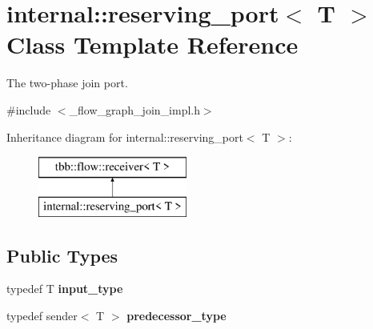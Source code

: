 \hypertarget{classinternal_1_1reserving__port}{}\section{internal\+:\+:reserving\+\_\+port$<$ T $>$ Class Template Reference}
\label{classinternal_1_1reserving__port}


The two-\/phase join port.  




{\ttfamily \#include $<$\+\_\+flow\+\_\+graph\+\_\+join\+\_\+impl.\+h$>$}

Inheritance diagram for internal\+:\+:reserving\+\_\+port$<$ T $>$\+:\begin{figure}[H]
\begin{center}
\leavevmode
\includegraphics[height=2.000000cm]{classinternal_1_1reserving__port}
\end{center}
\end{figure}
\subsection*{Public Types}
\begin{DoxyCompactItemize}
\item 
\hypertarget{classinternal_1_1reserving__port_ac07b82db2ba68fff390b5b50fe6360fc}{}typedef T {\bfseries input\+\_\+type}\label{classinternal_1_1reserving__port_ac07b82db2ba68fff390b5b50fe6360fc}

\item 
\hypertarget{classinternal_1_1reserving__port_a29c40039213dc6d76db64170a48de000}{}typedef sender$<$ T $>$ {\bfseries predecessor\+\_\+type}\label{classinternal_1_1reserving__port_a29c40039213dc6d76db64170a48de000}

\end{DoxyCompactItemize}
